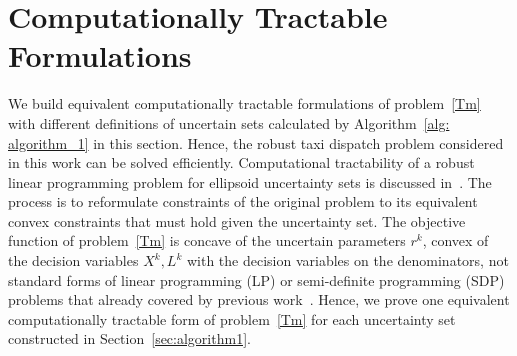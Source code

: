 \documentclass[10pt,twocolumn,twoside,english]{IEEEtran}
\begin{document}
\section{Computationally Tractable Formulations}
\label{sec:algorithm}
We build equivalent computationally tractable formulations of problem~\eqref{Tm} with different definitions of uncertain sets calculated by Algorithm~\ref{alg: algorithm_1} in this section. Hence, the robust taxi dispatch problem considered in this work can be solved efficiently. Computational tractability of a robust linear programming problem for ellipsoid uncertainty sets is discussed in~\cite{robustconvex}. The process is to reformulate constraints of the original problem to its equivalent convex constraints that must hold given the uncertainty set. The objective function of problem~\eqref{Tm} is concave of the uncertain parameters $r^k$, convex of the decision variables $X^k, L^k$ with the decision variables on the denominators, not standard forms of linear programming (LP) or semi-definite programming (SDP) problems that already covered by previous work~\cite{robustconvex, datad_robust}. Hence, we prove one equivalent computationally tractable form of problem~\eqref{Tm} for each uncertainty set constructed in Section~\ref{sec:algorithm1}.
\end{document}
